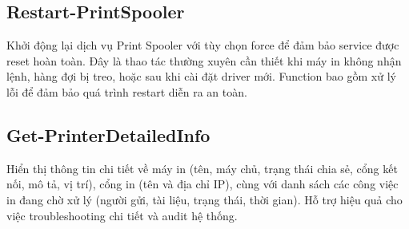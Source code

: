 \subsection{Restart-PrintSpooler}
Khởi động lại dịch vụ Print Spooler với tùy chọn force để đảm bảo service được reset hoàn toàn. Đây là thao tác thường xuyên cần thiết khi máy in không nhận lệnh, hàng đợi bị treo, hoặc sau khi cài đặt driver mới. Function bao gồm xử lý lỗi để đảm bảo quá trình restart diễn ra an toàn.

\subsection{Get-PrinterDetailedInfo}
Hiển thị thông tin chi tiết về máy in (tên, máy chủ, trạng thái chia sẻ, cổng kết nối, mô tả, vị trí), cổng in (tên và địa chỉ IP), cùng với danh sách các công việc in đang chờ xử lý (người gửi, tài liệu, trạng thái, thời gian). Hỗ trợ hiệu quả cho việc troubleshooting chi tiết và audit hệ thống.


